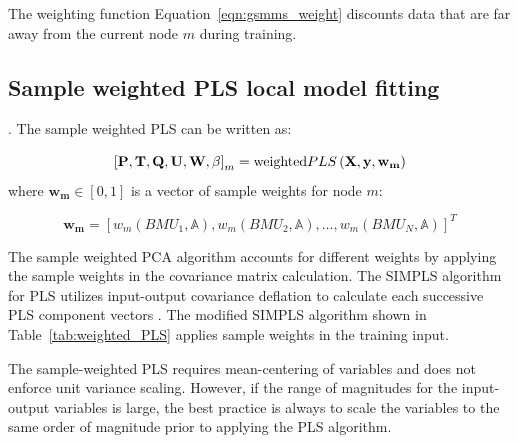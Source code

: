 \documentclass[review,3p]{elsarticle}
\renewcommand\[{\begin{equation}}
\renewcommand\]{\end{equation}}
\begin{document}
The weighting function Equation~\ref{eqn:gsmms_weight} discounts data that are far away from the current node $m$ during training. 

\subsection{Sample weighted PLS local model fitting}
. The sample weighted PLS can be written as:

\[\left[ {\mathbf{P},\mathbf{T},\mathbf{Q},\mathbf{U},\mathbf{W},\mathbf{\beta} } \right]_m = {\rm{weighted}}PLS\left( {\mathbf{X},\mathbf{y},\mathbf{w_m}} \right)\]
where $\mathbf{w_m} \in [0,1]$  is a vector of sample weights for node $m$:

\[
\mathbf{w_m} = \left[ w_m(BMU_1,\mathbb A), w_m(BMU_2,\mathbb A), \ldots, w_m(BMU_N,\mathbb A) \right]^T
\]

The sample weighted PCA algorithm accounts for different weights by applying the sample weights in the 
covariance matrix calculation.
The SIMPLS algorithm for PLS utilizes input-output covariance deflation to calculate
each successive PLS component vectors \cite{Jong1992}. The modified SIMPLS
algorithm shown in Table~\ref{tab:weighted_PLS} applies sample weights in the training input.

The sample-weighted PLS requires mean-centering of variables and does not
enforce unit variance scaling. However, if the range of magnitudes for the
input-output variables is large, the best practice is always to scale the
variables to the same order of magnitude prior to applying the PLS algorithm.
\end{document}
